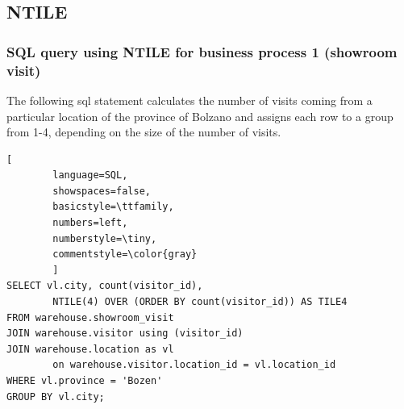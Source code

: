 \documentclass[letterpaper,12pt]{article}
\begin{document}
\subsection{NTILE}

\subsubsection{SQL query using NTILE for business process 1 (showroom visit)}

The following sql statement calculates the number of visits coming from a particular location of the province of Bolzano and assigns each row to a group from 1-4, depending on the size of the number of visits.

\begin{lstlisting}[
        language=SQL,
        showspaces=false,
        basicstyle=\ttfamily,
        numbers=left,
        numberstyle=\tiny,
        commentstyle=\color{gray}
        ]	 
SELECT vl.city, count(visitor_id), 
        NTILE(4) OVER (ORDER BY count(visitor_id)) AS TILE4
FROM warehouse.showroom_visit
JOIN warehouse.visitor using (visitor_id)
JOIN warehouse.location as vl 
        on warehouse.visitor.location_id = vl.location_id 
WHERE vl.province = 'Bozen'
GROUP BY vl.city;
\end{lstlisting}
\end{document}
